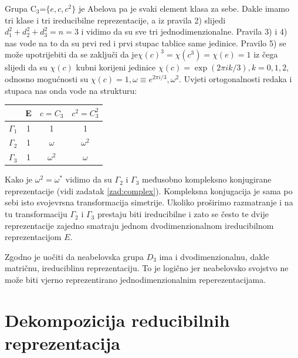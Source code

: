 \begin{primjer}

Grupa C$_3$=$\{e, c, c^2\}$ je Abelova pa je svaki element klasa za sebe.
Dakle imamo tri klase i tri ireducibilne reprezentacije,
a iz pravila 2) slijedi $d_{1}^2+d_{2}^2+d_{3}^2 = n =3$
i vidimo da su sve tri jednodimenzionalne.
Pravila 3) i 4) nas vode na to da su prvi red i prvi stupac
tablice same jedinice.
Pravilo 5) se može upotrijebiti da se zaključi da
je$\chi(c)^3=\chi(c^3)=\chi(e)=1$ iz čega slijedi da su $\chi(c)$
kubni korijeni jedinice $\chi(c) = \exp(2\pi i k/3), k=0, 1, 2$,
odnosno mogućnosti su $\chi(c)=1, \omega\equiv e^{2\pi i/3}, \omega^2$.
Uvjeti ortogonalnosti redaka i stupaca nas onda vode na
strukturu:
\begin{center}
\begin{tabular}{c|ccc}
  & E & $c=C_3$  & $c^2=C_{3}^2$ \\ \hline
$\Gamma_{1}$ & 1 & 1& 1 \\
$\Gamma_{2}$  & 1 & $\omega$ &$\omega^2$  \\
$\Gamma_{3}$  & 1 &$\omega^2$ & $\omega$ 
\end{tabular}
\end{center}
Kako je $\omega^2 = \omega^* $ vidimo da
su $\Gamma_2$ i $\Gamma_3$ međusobno kompleksno
konjugirane reprezentacije (vidi zadatak \ref{zad:complex}).
Kompleksna konjugacija je sama po sebi isto svojevrsna transformacija
simetrije. Ukoliko proširimo razmatranje i na tu transformaciju $\Gamma_2$
i $\Gamma_3$ prestaju biti ireducibilne i zato se često te dvije reprezentacije
zajedno smatraju jednom dvodimenzionalnom ireducibilnom reprezentacijom $E$.
\end{primjer}


Zgodno je uočiti da neabelovska grupa $D_3$ ima i dvodimenzionalnu, dakle matričnu,
ireduciblinu reprezentaciju. To je logično jer neabelovsko svojstvo ne može biti
vjerno reprezentirano jednodimenzionalnim reperezentacijama.

\section{Dekompozicija reducibilnih reprezentacija}

